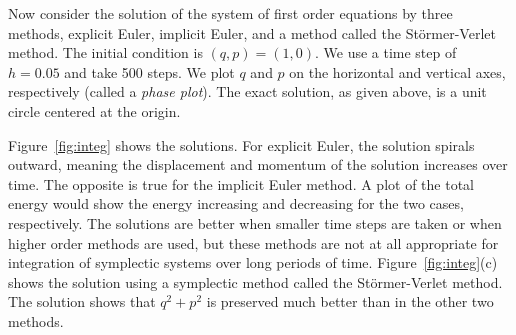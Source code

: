 Now consider the solution of the system of first order equations
by three methods, explicit Euler, implicit Euler, and a method
called the St\"{o}rmer-Verlet method.  The initial condition is $(q,p) = (1,0)$.
We use a time step of $h=0.05$ and
take 500 steps.  We plot $q$ and $p$ on the horizontal and
vertical axes, respectively (called a {\em phase plot}).  The 
exact solution, as given above, is a unit circle centered
at the origin.

Figure~\ref{fig:integ} shows the solutions.  For explicit Euler,
the solution spirals outward, meaning the displacement and 
momentum of the solution increases over time.  The opposite is
true for the implicit Euler method.  A plot of the total energy
would show the energy increasing and decreasing for the two
cases, respectively.  The solutions are better when smaller time
steps are taken or when higher order methods are used, but
these methods are not at all appropriate 
for integration of symplectic systems over long periods of time.
Figure~\ref{fig:integ}(c) shows the solution using a symplectic
method called the St\"{o}rmer-Verlet
method.  The solution shows that $q^2 + p^2$ is preserved much
better than in the other two methods.

